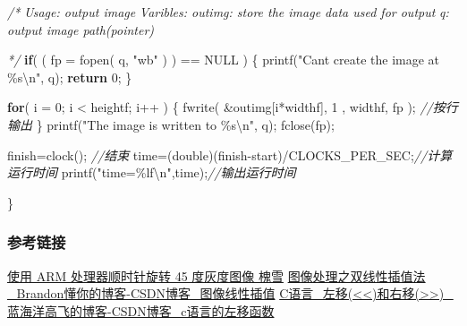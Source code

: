\documentclass[
]{article}
\newenvironment{Shaded}{}{}
\newcommand{\CommentTok}[1]{\textcolor[rgb]{0.38,0.63,0.69}{\textit{#1}}}
\newcommand{\ControlFlowTok}[1]{\textcolor[rgb]{0.00,0.44,0.13}{\textbf{#1}}}
\newcommand{\DataTypeTok}[1]{\textcolor[rgb]{0.56,0.13,0.00}{#1}}
\newcommand{\DecValTok}[1]{\textcolor[rgb]{0.25,0.63,0.44}{#1}}
\newcommand{\NormalTok}[1]{#1}
\newcommand{\OperatorTok}[1]{\textcolor[rgb]{0.40,0.40,0.40}{#1}}
\newcommand{\SpecialCharTok}[1]{\textcolor[rgb]{0.25,0.44,0.63}{#1}}
\newcommand{\StringTok}[1]{\textcolor[rgb]{0.25,0.44,0.63}{#1}}
\begin{document}
\begin{Shaded}
\begin{Highlighting}[]
    \CommentTok{/*}
\CommentTok{    Usage: output image}
\CommentTok{    Varibles:   outimg:  store the image data used for output}
\CommentTok{                q:       output image path(pointer) }

\CommentTok{     */}
    \ControlFlowTok{if}\OperatorTok{(} \OperatorTok{(}\NormalTok{ fp }\OperatorTok{=}\NormalTok{ fopen}\OperatorTok{(}\NormalTok{ q}\OperatorTok{,} \StringTok{"wb"} \OperatorTok{)} \OperatorTok{)} \OperatorTok{==}\NormalTok{ NULL }\OperatorTok{)}  
    \OperatorTok{\{}  
\NormalTok{        printf}\OperatorTok{(}\StringTok{"Can\textquotesingle{}t create the image at \%s}\SpecialCharTok{\textbackslash{}n}\StringTok{"}\OperatorTok{,}\NormalTok{ q}\OperatorTok{);}  
        \ControlFlowTok{return} \DecValTok{0}\OperatorTok{;}  
    \OperatorTok{\}}  
      
    \ControlFlowTok{for}\OperatorTok{(}\NormalTok{ i }\OperatorTok{=} \DecValTok{0}\OperatorTok{;}\NormalTok{ i }\OperatorTok{\textless{}}\NormalTok{ heightf}\OperatorTok{;}\NormalTok{ i}\OperatorTok{++} \OperatorTok{)} \OperatorTok{\{}  
\NormalTok{        fwrite}\OperatorTok{(} \OperatorTok{\&}\NormalTok{outimg}\OperatorTok{[}\NormalTok{i}\OperatorTok{*}\NormalTok{widthf}\OperatorTok{],} \DecValTok{1} \OperatorTok{,}\NormalTok{ widthf}\OperatorTok{,}\NormalTok{ fp }\OperatorTok{);}  \CommentTok{//按行输出}
    \OperatorTok{\}} 
\NormalTok{    printf}\OperatorTok{(}\StringTok{"The image is written to \%s}\SpecialCharTok{\textbackslash{}n}\StringTok{"}\OperatorTok{,}\NormalTok{ q}\OperatorTok{);}  
\NormalTok{    fclose}\OperatorTok{(}\NormalTok{fp}\OperatorTok{);}

\NormalTok{    finish}\OperatorTok{=}\NormalTok{clock}\OperatorTok{();}    \CommentTok{//结束}
\NormalTok{    time}\OperatorTok{=(}\DataTypeTok{double}\OperatorTok{)(}\NormalTok{finish}\OperatorTok{{-}}\NormalTok{start}\OperatorTok{)/}\NormalTok{CLOCKS\_PER\_SEC}\OperatorTok{;}\CommentTok{//计算运行时间}
\NormalTok{    printf}\OperatorTok{(}\StringTok{"time=\%lf}\SpecialCharTok{\textbackslash{}n}\StringTok{"}\OperatorTok{,}\NormalTok{time}\OperatorTok{);}\CommentTok{//输出运行时间}

\OperatorTok{\}}
\end{Highlighting}
\end{Shaded}

\hypertarget{ux53c2ux8003ux94feux63a5}{%
\subsubsection{参考链接}\label{ux53c2ux8003ux94feux63a5}}

\href{https://www.lvxuefei.top/\%E4\%BD\%BF\%E7\%94\%A8ARM-\%E5\%A4\%84\%E7\%90\%86\%E5\%99\%A8\%E9\%A1\%BA\%E6\%97\%B6\%E9\%92\%88\%E6\%97\%8B\%E8\%BD\%AC45\%E5\%BA\%A6\%E7\%81\%B0\%E5\%BA\%A6\%E5\%9B\%BE\%E5\%83\%8F/\#comments}{使用
ARM 处理器顺时针旋转 45 度灰度图像 \textbar{} 槐雪}
\href{https://blog.csdn.net/qq_37577735/article/details/80041586}{图像处理之双线性插值法\_Brandon懂你的博客-CSDN博客\_图像线性插值}
\href{https://blog.csdn.net/u012745229/article/details/51405332}{C语言\_左移(\textless\textless)和右移(\textgreater\textgreater)\_蓝海洋高飞的博客-CSDN博客\_c语言的左移函数}
\end{document}
